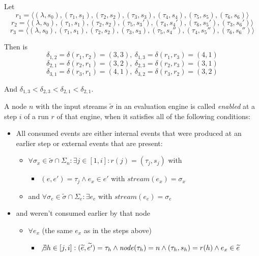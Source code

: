 \begin{exmp}
  Let
  \[r_1 = \langle (\lambda, s_0), (\tau_1,s_1), (\tau_2,s_2), (\tau_3,s_3), (\tau_4,s_4), (\tau_5,s_5), (\tau_6,s_6) \rangle\]
  \[r_2 = \langle (\lambda, s_0), (\tau_1,s_1), (\tau_2,s_2), (\tau_5,s_3'), (\tau_4,s_4'), (\tau_6,s_5'), (\tau_3,s_6') \rangle\]
  \[r_3 = \langle (\lambda, s_0), (\tau_1,s_1), (\tau_2,s_2), (\tau_3,s_3), (\tau_5,s_4''), (\tau_4,s_5''), (\tau_6,s_6'') \rangle\]

  Then is
  \[\delta_{1,2} = \delta(r_1,r_2) = (3,3),\ \delta_{1,3} = \delta(r_1,r_3) = (4,1)\]
  \[\delta_{2,1} = \delta(r_2,r_1) = (3,2),\ \delta_{2,3} = \delta(r_2,r_3) = (3,1)\]
  \[\delta_{3,1} = \delta(r_3,r_1) = (4,1),\ \delta_{3,2} = \delta(r_3,r_2) = (3,2)\]

  And \(\delta_{1,3} < \delta_{2,3} < \delta_{2,1} < \delta_{2,1}\).


\end{exmp}

\begin{definition}[name = Enabledness of a Node]\label{def:node_enabled}
  A node \(n\) with the input streams \(\widetilde{\sigma}\) in an evaluation engine is called \emph{enabled} at a step \(i\) of a run \(r\) of that engine, when it satisfies all of the following conditions:

  \begin{itemize}
    \item All consumed events are either internal events that were produced at an earlier step or external events that are present:
      \begin{itemize}
        \item \(\forall \sigma_x \in \widetilde{\sigma} \cap \Sigma_n: \exists j \in [1, i]: r(j) = (\tau_j, s_j)\) with
          \begin{itemize}
            \item\( (e, e') = \tau_j \land e_x \in e'\) with \(\mathit{stream}(e_x) = \sigma_x \)
          \end{itemize}
        \item and \(\forall \sigma_e \in \widetilde{\sigma} \cap\Sigma_e:\exists e_e\) with \(\mathit{stream}(e_e) = \sigma_e\)
      \end{itemize}
    \item and weren't consumed earlier by that node
      \begin{itemize}
        \item \(\forall e_x\) (the same \(e_x\) as in the steps above)
          \begin{itemize}
            \item \(\not\exists h \in [j, i]: (\widetilde{e}, \widetilde{e'}) = \tau_h \land \mathit{node}(\tau_h) = n \land (\tau_h, s_h) = r(h) \land e_x \in \widetilde{e}\)
          \end{itemize}
      \end{itemize}
  \end{itemize}
\end{definition}

